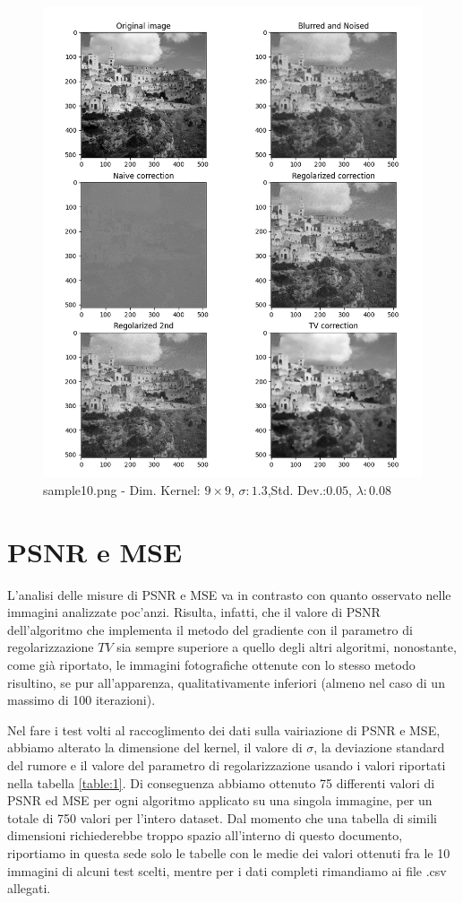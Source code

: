 \documentclass[12pt]{article}
\begin{document}
    \begin{figure}[h!]
    \includegraphics[width=14cm]{sample10}
    \caption{sample10.png - Dim. Kernel: $9\times9$, $\sigma:1.3$,Std. Dev.:$0.05$, $\lambda:0.08$}
    \end{figure}
    \newpage

\section{PSNR e MSE}
    L'analisi delle misure di PSNR e MSE va in contrasto con quanto osservato nelle immagini analizzate poc'anzi. Risulta, infatti, che il valore di PSNR dell'algoritmo che implementa il metodo del gradiente con il parametro di regolarizzazione $TV$ sia sempre superiore a quello degli altri algoritmi, nonostante, come già riportato, le immagini fotografiche ottenute con lo stesso metodo risultino, se pur all'apparenza, qualitativamente inferiori (almeno nel caso di un massimo di 100 iterazioni).

    Nel fare i test volti al raccoglimento dei dati sulla vairiazione di PSNR e MSE, abbiamo alterato la dimensione del kernel, il valore di $\sigma$, la deviazione standard del rumore e il valore del parametro di regolarizzazione usando i valori riportati nella tabella \ref{table:1}. Di conseguenza abbiamo ottenuto 75 differenti valori di PSNR ed MSE per ogni algoritmo applicato su una singola immagine, per un totale di 750 valori per l'intero dataset. Dal momento che una tabella di simili dimensioni richiederebbe troppo spazio all'interno di questo documento, riportiamo in questa sede solo le tabelle con le medie dei valori ottenuti fra le 10 immagini di alcuni test scelti, mentre per i dati completi rimandiamo ai file .csv allegati.
\end{document}
